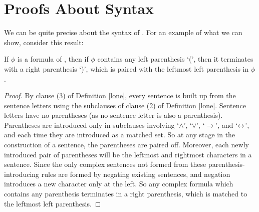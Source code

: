\section{Proofs About Syntax}


We can be quite precise about the syntax of \lone. For an example of what we can show, consider this result: \begin{theorem}\label{thmpm}	If $\phi$ is a formula of \lone, then if $\phi$ contains any left parenthesis `(', then it terminates with a right parenthesis `)', which is paired with the leftmost left parenthesis in $\phi$ \citep[\S 2, Theorem 1]{sep-logic-classical}. \begin{proof}
		By clause (3) of Definition \ref{lone}, every sentence is built up from the sentence letters using the subclauses of clause (2) of Definition \ref{lone}. Sentence letters have no parentheses (as no sentence letter is also a parenthesis). Parentheses are introduced only in subclauses involving `$\wedge$', `$\vee$', `$\to$', and `$\leftrightarrow$', and each time they are introduced as a matched set. So at any stage in the construction of a sentence, the parentheses are paired off. Moreover, each newly introduced pair of parentheses will be the leftmost and rightmost characters in a sentence. Since the only complex sentences not formed from these parenthesis-introducing rules are formed by negating existing sentences, and negation introduces a new character only at the left. So any complex formula which contains any parenthesis terminates in a right parenthesis, which is matched to the leftmost left parenthesis.
	\end{proof}
\end{theorem}
